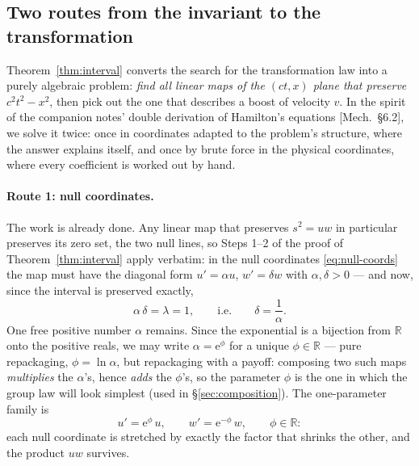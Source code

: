 \documentclass[11pt]{article}
\theoremstyle{plain}
\theoremstyle{definition}
\theoremstyle{remark}
\newcommand{\ee}{\mathrm{e}}
\newcommand{\R}{\mathbb{R}}
\begin{document}
\subsection{Two routes from the invariant to the transformation}
\label{sec:lorentz-derivation}

Theorem~\ref{thm:interval} converts the search for the transformation law
into a purely algebraic problem: \emph{find all linear maps of the
$(ct,x)$ plane that preserve $c^2t^2 - x^2$}, then pick out the one that
describes a boost of velocity $v$. In the spirit of the companion notes'
double derivation of Hamilton's equations [Mech.\ \S6.2], we solve it
twice: once in coordinates adapted to the problem's structure, where the
answer explains itself, and once by brute force in the physical
coordinates, where every coefficient is worked out by hand.

\paragraph{Route 1: null coordinates.}
The work is already done. Any linear map that preserves
$s^2 = uw$ in particular preserves its zero set, the two null lines, so
Steps 1--2 of the proof of Theorem~\ref{thm:interval} apply verbatim:
in the null coordinates \eqref{eq:null-coords} the map must have the
diagonal form $u' = \alpha u$, $w' = \delta w$ with $\alpha, \delta > 0$
--- and now, since the interval is preserved exactly,
\begin{equation}
  \alpha\,\delta = \lambda = 1,
  \qquad\text{i.e.}\qquad
  \delta = \frac{1}{\alpha}.
\end{equation}
One free positive number $\alpha$ remains. Since the exponential is a
bijection from $\R$ onto the positive reals, we may write
$\alpha = \ee^{\phi}$ for a unique $\phi \in \R$ --- pure repackaging,
$\phi = \ln\alpha$, but repackaging with a payoff: composing two such
maps \emph{multiplies} the $\alpha$'s, hence \emph{adds} the $\phi$'s, so
the parameter $\phi$ is the one in which the group law will look
simplest (used in \S\ref{sec:composition}). The one-parameter
family is
\begin{equation}
  u' = \ee^{\phi}\, u,
  \qquad
  w' = \ee^{-\phi}\, w,
  \qquad \phi \in \R :
  \label{eq:null-boost}
\end{equation}
each null coordinate is stretched by exactly the factor that shrinks the
other, and the product $uw$ survives.
\end{document}
